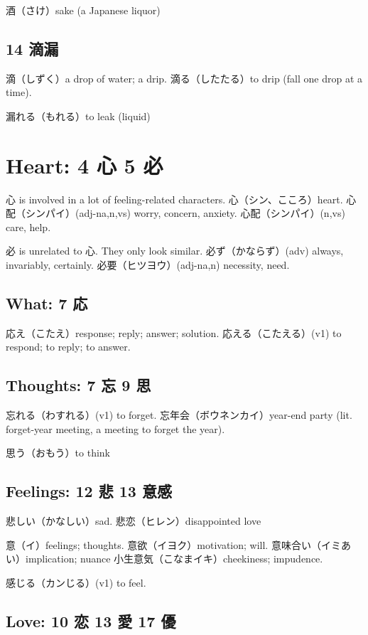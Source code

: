 酒（さけ）sake (a Japanese liquor)

\subsection{14 滴漏}

滴（しずく）a drop of water; a drip.
滴る（したたる）to drip (fall one drop at a time).

漏れる（もれる）to leak (liquid)

\section{Heart: 4 心 5 必}

心 is involved in a lot of feeling-related characters.
心（シン、こころ）heart.
心配（シンパイ）(adj-na,n,vs) worry, concern, anxiety.
心配（シンパイ）(n,vs) care, help.

必 is unrelated to 心. They only look similar.
必ず（かならず）(adv) always, invariably, certainly.
必要（ヒツヨウ）(adj-na,n) necessity, need.

\subsection{What: 7 応}

応え（こたえ）response; reply; answer; solution.
応える（こたえる）(v1) to respond; to reply; to answer.

\subsection{Thoughts: 7 忘 9 思}

忘れる（わすれる）(v1) to forget.
忘年会（ボウネンカイ）year-end party
(lit. forget-year meeting, a meeting to forget the year).

思う（おもう）to think

\subsection{Feelings: 12 悲 13 意感}

悲しい（かなしい）sad.
悲恋（ヒレン）disappointed love

意（イ）feelings; thoughts.
意欲（イヨク）motivation; will.
意味合い（イミあい）implication; nuance
小生意気（こなまイキ）cheekiness; impudence.

感じる（カンじる）(v1) to feel.

\subsection{Love: 10 恋 13 愛 17 優}


